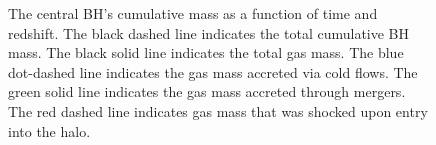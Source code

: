 \documentclass[manuscript]{aastex}
\begin{document}
\begin{figure}
\centerline{}
\caption[]{The central BH’s cumulative mass as a function of time and redshift. The black dashed line indicates the total cumulative BH mass. The black solid line indicates the total gas mass. The blue dot-dashed line indicates the gas mass accreted via cold flows. The green solid line indicates the gas mass accreted through mergers. The red dashed line indicates gas mass that was shocked upon entry into the halo.}
\label{h258allmassgas} 
\end{figure}
\end{document}
